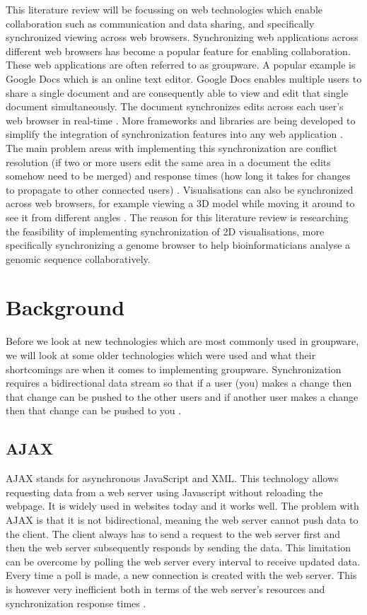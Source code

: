 \documentclass[prodmode,acmtecs]{acmsmall}
\begin{document}
This literature review will be focussing on web technologies which enable collaboration such as communication and data sharing, and specifically synchronized viewing across web browsers. Synchronizing web applications across different web browsers has become a popular feature for enabling collaboration. These web applications are often referred to as groupware. A popular example is Google Docs which is an online text editor. Google Docs enables multiple users to share a single document and are consequently able to view and edit that single document simultaneously. The document synchronizes edits across each user's web browser in real-time \cite{koren2013shared}. More frameworks and libraries are being developed to simplify the integration of synchronization features into any web application \cite{ozono2012real}. The main problem areas with implementing this synchronization are conflict resolution (if two or more users edit the same area in a document the edits somehow need to be merged) and response times (how long it takes for changes to propagate to other connected users) \cite{heinrich2012enriching}. Visualisations can also be synchronized across web browsers, for example viewing a 3D model while moving it around to see it from different angles \cite{marion2012real}. The reason for this literature review is researching the feasibility of implementing synchronization of 2D visualisations, more specifically synchronizing a genome browser to help bioinformaticians analyse a genomic sequence collaboratively.  

\section{Background}
Before we look at new technologies which are most commonly used in groupware, we will look at some older technologies which were used and what their shortcomings are when it comes to implementing groupware. Synchronization requires a bidirectional data stream so that if a user (you) makes a change then that change can be pushed to the other users and if another user makes a change then that change can be pushed to you \cite{linner2012instant}.

\subsection{AJAX} 
AJAX stands for asynchronous JavaScript and XML. This technology allows requesting data from a web server using Javascript without reloading the webpage. It is widely used in websites today and it works well. The problem with AJAX is that it is not bidirectional, meaning the web server cannot push data to the client. The client always has to send a request to the web server first and then the web server subsequently responds by sending the data. This limitation can be overcome by polling the web server every interval to receive updated data. Every time a poll is made, a new connection is created with the web server. This is however very inefficient both in terms of the web server's resources and synchronization response times \cite{gutwin2011real}. 
\end{document}

